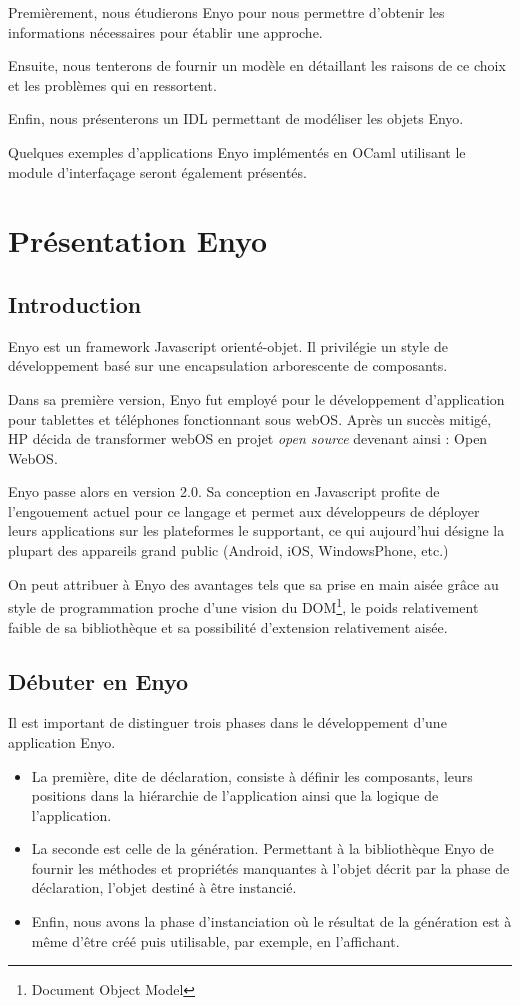 \documentclass[11pt,a4paper]{report}
\begin{document}
Premièrement, nous étudierons Enyo pour nous permettre d'obtenir les informations nécessaires 
pour établir une approche.

Ensuite, nous tenterons de fournir un modèle en détaillant les raisons de ce choix et les problèmes
qui en ressortent.

Enfin, nous présenterons un IDL permettant de modéliser les objets Enyo.

Quelques exemples d'applications Enyo implémentés en OCaml utilisant le module d'interfaçage
seront également présentés.

\chapter{Présentation Enyo}\label{chap:enyo}
\section{Introduction}
Enyo\cite{enyo} est un framework Javascript orienté-objet. Il privilégie un style de développement basé
sur une encapsulation arborescente de composants.\medskip

Dans sa première version, Enyo fut employé pour le développement d'application pour 
tablettes et téléphones fonctionnant sous webOS. Après un succès mitigé,
HP décida de transformer webOS en projet \emph{open source} devenant ainsi : Open WebOS.\medskip

Enyo passe alors en version 2.0. Sa conception en Javascript profite de  
l'engouement actuel pour ce langage et permet aux développeurs de déployer leurs 
applications sur les plateformes le supportant, ce qui aujourd'hui désigne 
la plupart des appareils grand public (Android, iOS, WindowsPhone, etc.)\medskip

On peut attribuer à Enyo des avantages tels que sa prise en main aisée grâce au style 
de programmation proche d'une vision du DOM\footnote{Document Object Model}, le poids relativement 
faible de sa bibliothèque et sa possibilité d'extension relativement aisée.

\clearpage

\section{Débuter en Enyo}

Il est important de distinguer trois phases dans le développement d'une application 
Enyo.
\begin{itemize}
\item La première, dite de déclaration, consiste à définir les composants, leurs positions dans 
la hiérarchie de l'application ainsi que la logique de l'application.
\item La seconde est celle de la génération. Permettant à la bibliothèque Enyo de 
  fournir les méthodes et propriétés manquantes à l'objet décrit par la phase 
  de déclaration, l'objet destiné à être instancié.
\item Enfin, nous avons la phase d'instanciation où le résultat de la génération
est à même d'être créé puis utilisable, par exemple, en l'affichant.
\end{itemize}\medskip
\end{document}

